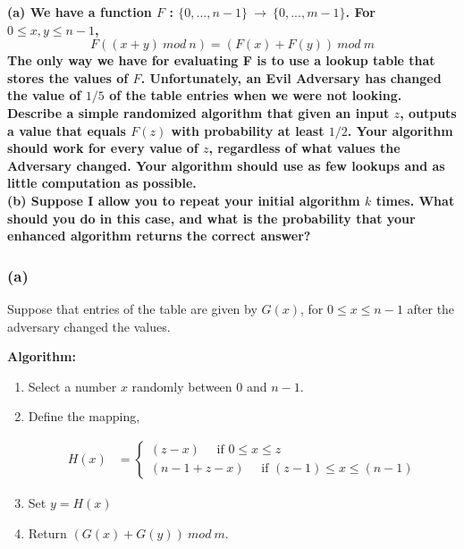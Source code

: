 \documentclass[a4paper]{article}
\begin{document}
\pagebreak

\begin{question}[]
\textbf{(a) We have a function $F$ : $\{0,...,n-1\}\ \rightarrow\ \{0,...,m-1\}$. For $0 \leq x,y \leq n-1$, $$F((x+y)\ mod\ n) = (F(x)+F(y))\ mod\ m$$ The only way we have for evaluating F is to use a lookup table that stores the values of $F$. Unfortunately, an Evil Adversary has changed the value of $1/5$ of the table entries when we were not looking. Describe a simple randomized algorithm that given an input $z$, outputs a value that equals $F(z)$ with
probability at least $1/2$. Your algorithm should work for every value of $z$, regardless of what values the Adversary changed. Your algorithm should use as few lookups and as little computation as possible.} \\
\textbf{(b) Suppose I allow you to repeat your initial algorithm $k$ times. What should you do in this case, and what is the probability that your enhanced algorithm returns the correct answer?}
\end{question}
\subsubsection*{(a)}
Suppose that entries of the table are given by $G(x)$, for $0 \leq x \leq n-1$ after the adversary changed the values.

\textbf{Algorithm:}
\begin{enumerate}
    \item Select a number $x$ randomly between $0$ and $n-1$.
    \item Define the mapping, 

\begin{align*}
    H(x) & = \begin{cases}
        (z - x) \quad \text{ if } 0 \leq x \leq z \\
    (n - 1 + z - x) \quad \text{ if } (z-1) \leq x \leq (n-1) 
        \end{cases}
\end{align*}
    \item Set $y = H(x)$ 
    \item Return $(G(x)+G(y))\ mod\ m$.
\end{enumerate} 
\begin{warn}
\end{warn}
\end{document}
